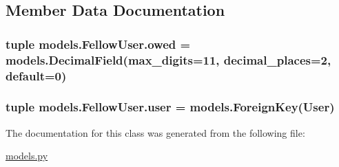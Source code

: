 \subsection{Member Data Documentation}
\hypertarget{classmodels_1_1_fellow_user_aa990390ffe2a4131de17ee9be0afa73b}{
\subsubsection[{owed}]{\setlength{\rightskip}{0pt plus 5cm}tuple models.\-Fellow\-User.\-owed = models.\-Decimal\-Field(max\-\_\-digits=11, decimal\-\_\-places=2, default=0)\hspace{0.3cm}{\ttfamily [static]}}}\label{classmodels_1_1_fellow_user_aa990390ffe2a4131de17ee9be0afa73b}
\hypertarget{classmodels_1_1_fellow_user_a5e7120d242fc32956e2b7a0f146d0c86}{
\subsubsection[{user}]{\setlength{\rightskip}{0pt plus 5cm}tuple models.\-Fellow\-User.\-user = models.\-Foreign\-Key(User)\hspace{0.3cm}{\ttfamily [static]}}}\label{classmodels_1_1_fellow_user_a5e7120d242fc32956e2b7a0f146d0c86}


The documentation for this class was generated from the following file\-:\begin{DoxyCompactItemize}
\item 
\hyperlink{models_8py}{models.\-py}\end{DoxyCompactItemize}
